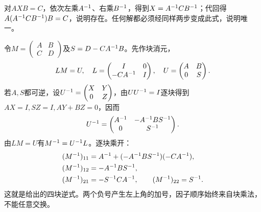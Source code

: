 \label{der:2-4}
对$AXB=C$，依次左乘$A^{-1}$、右乘$B^{-1}$，得到$X=A^{-1} CB^{-1}$；代回得$A(A^{-1} CB^{-1})B=C$，说明存在。任何解都必须经同样两步变成此式，说明唯一。

令$M=\begin{pmatrix}A&B\\C&D\end{pmatrix}$及$S=D-CA^{-1} B$。先作块消元，
\[LM=U,\quad L=\begin{pmatrix}I&0\\-CA^{-1}&I\end{pmatrix},\quad U=\begin{pmatrix}A&B\\0&S\end{pmatrix}.\]
若$A,S$都可逆，设$U^{-1}=\begin{pmatrix}X&Y\\0&Z\end{pmatrix}$，由$UU^{-1}=I$逐块得到$AX=I,SZ=I,AY+BZ=0$，因而
\[U^{-1}=\begin{pmatrix}A^{-1}&-A^{-1} BS^{-1}\\0&S^{-1}\end{pmatrix}.\]
由$LM=U$有$M^{-1}=U^{-1} L$。逐块乘开：
\[\begin{aligned}
(M^{-1})_{11}&=A^{-1}+(-A^{-1} BS^{-1})(-CA^{-1}),\\
(M^{-1})_{12}&=-A^{-1} BS^{-1},\\
(M^{-1})_{21}&=-S^{-1} CA^{-1},\qquad (M^{-1})_{22}=S^{-1}.
\end{aligned}\]
这就是给出的四块逆式。两个负号产生左上角的加号，因子顺序始终来自块乘法，不能任意交换。
